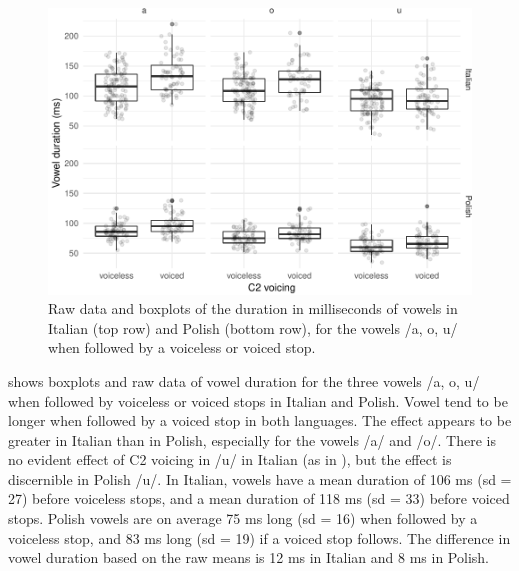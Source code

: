 \documentclass[preprint]{JASAnew}
\begin{document}
\begin{figure}
\includegraphics[width=\linewidth]{2018-jasa_files/figure-latex/Figure2-1} \caption{Raw data and boxplots of the duration in milliseconds of vowels in Italian (top row) and Polish (bottom row), for the vowels /a, o, u/ when followed by a voiceless or voiced stop.}\label{f:Figure2}
\end{figure}

 shows boxplots and raw data of vowel duration for
the three vowels /a, o, u/ when followed by voiceless or voiced stops in
Italian and Polish. Vowel tend to be longer when followed by a voiced
stop in both languages. The effect appears to be greater in Italian than
in Polish, especially for the vowels /a/ and /o/. There is no evident
effect of C2 voicing in /u/ in Italian (as in \citealt{ferrero1978}),
but the effect is discernible in Polish /u/. In Italian, vowels have a
mean duration of 106 ms (sd = 27) before voiceless stops, and a mean
duration of 118 ms (sd = 33) before voiced stops. Polish vowels are on
average 75 ms long (sd = 16) when followed by a voiceless stop, and 83
ms long (sd = 19) if a voiced stop follows. The difference in vowel
duration based on the raw means is 12 ms in Italian and 8 ms in Polish.
\end{document}

